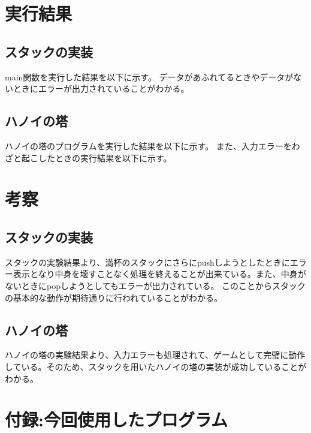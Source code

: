\documentclass[dvipdfmx]{jsarticle}
\begin{document}
\section{実行結果}
\subsection{スタックの実装}
main関数を実行した結果を以下に示す。
% 
データがあふれてるときやデータがないときにエラーが出力されていることがわかる。
\subsection{ハノイの塔}
ハノイの塔のプログラムを実行した結果を以下に示す。
% 
また、入力エラーをわざと起こしたときの実行結果を以下に示す。\\

% 
\section{考察}
\subsection{スタックの実装}
スタックの実験結果より、満杯のスタックにさらにpushしようとしたときにエラー表示となり中身を壊すことなく処理を終えることが出来ている。また、中身がないときにpopしようとしてもエラーが出力されている。
このことからスタックの基本的な動作が期待通りに行われていることがわかる。
\subsection{ハノイの塔}
ハノイの塔の実験結果より、入力エラーも処理されて、ゲームとして完璧に動作している。そのため、スタックを用いたハノイの塔の実装が成功していることがわかる。

\section{付録:今回使用したプログラム}
% 
% 
\end{document}
